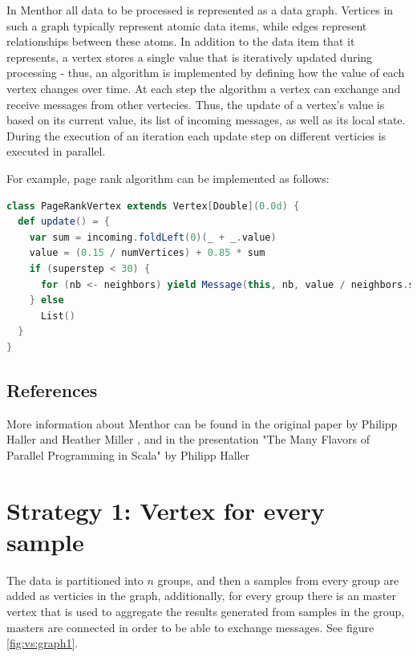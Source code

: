 \documentclass{report}
\begin{document}
In Menthor all data to be processed is represented as a data graph. Vertices in such a graph typically represent atomic data items, while edges represent relationships between these atoms. In addition to the data item that it represents, a vertex stores a
single value that is iteratively updated during processing - thus, an algorithm is implemented by defining how the value of each vertex changes over time. At each step the algorithm a vertex can exchange and receive messages from other vertecies. Thus, the update of a vertex’s value is based on its current value, its list of incoming messages, as well as its local state. During the execution of an iteration each update step on different verticies is executed in parallel.

For example, page rank algorithm can be implemented as follows:

\begin{lstlisting}[language=scala, caption={Page rank algorithm}, label={listing:pagerank}]
class PageRankVertex extends Vertex[Double](0.0d) {
  def update() = {
    var sum = incoming.foldLeft(0)(_ + _.value)
    value = (0.15 / numVertices) + 0.85 * sum
    if (superstep < 30) {
      for (nb <- neighbors) yield Message(this, nb, value / neighbors.size)
    } else
      List()
  }
}
\end{lstlisting}

\subsection{References}

More information about Menthor can be found in the original paper by Philipp Haller and Heather Miller \cite{oai:infoscience.epfl.ch:165111}, and in the presentation "The Many Flavors of Parallel Programming in Scala" by Philipp Haller \cite{scalaparallel}

\section{Strategy 1: Vertex for every sample}

The data is partitioned into $n$ groups, and then a samples from every group are added as verticies in the graph, additionally, for every group there is an master vertex that is used to aggregate the results generated from samples in the group, masters are connected in order to be able to exchange messages. See figure \ref{fig:vs:graph1}.
\end{document}
